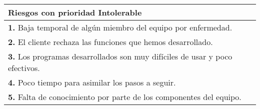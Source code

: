 \documentclass[spanish,a4paper,12pt]{report}	%
\begin{document}
			\begin{tabular}{|p{12cm}|}
				\hline
				\textbf{Riesgos con prioridad Intolerable}\\ \hline \hline
				\textbf{1.} Baja temporal de algún miembro del equipo por enfermedad.\\ \hline 
				\textbf{2.} El cliente rechaza las funciones que hemos desarrollado.\\ \hline
				\textbf{3.} Los programas desarrollados son muy difíciles de usar y poco efectivos. \\ \hline
				\textbf{4.} Poco tiempo para asimilar los pasos a seguir. \\ \hline
				\textbf{5.} Falta de conocimiento por parte de los componentes del equipo.\\ \hline
			\end{tabular}
			
				\ \\
				\ \\
			
\end{document}
